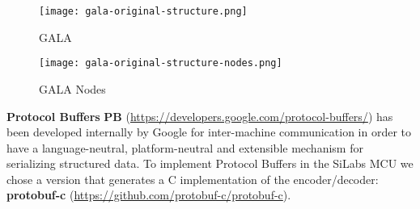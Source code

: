 \documentclass[10pt,a4]{article}
\begin{document}
\begin{figure}[ht]
    \centering
    \texttt{[image: gala-original-structure.png]}
    \caption{GALA}
    \label{fig:gala}
\end{figure}

\begin{figure}[ht]
    \centering
    \texttt{[image: gala-original-structure-nodes.png]}
    \caption{GALA Nodes}
    \label{fig:gala_nodes}
\end{figure}

\textbf{Protocol Buffers} \textbf{PB} (\url{https://developers.google.com/protocol-buffers/}) has been developed internally by Google for inter-machine communication in order to have a language-neutral, platform-neutral and extensible mechanism for serializing structured data. To implement Protocol Buffers in the SiLabs MCU we chose a version that generates a C implementation of the encoder/decoder: \textbf{protobuf-c} (\url{https://github.com/protobuf-c/protobuf-c}).\\
\end{document}
